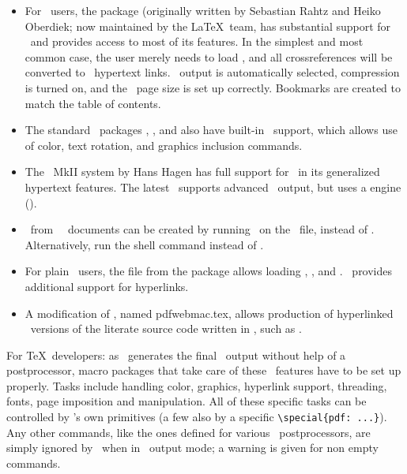 \documentclass{pdftexmanual}
\begin{document}
\begin{itemize}
\item  For \LATEX\ users, the  package (originally
       written by Sebastian Rahtz and Heiko Oberdiek; now maintained by
       the \LaTeX\ team, has substantial support for \PDFTEX\ and
       provides access to most of its features. In the simplest and most
       common case, the user merely needs to load , and
       all cross\hyph references will be converted to \PDF\ hypertext
       links. \PDF\ output is automatically selected, compression is
       turned on, and the \PDF\ page size is set up correctly. Bookmarks
       are created to match the table of contents.

\item  The standard \LATEX\ packages , , and
        also have built-in \PDFTEX\ support, which allows
       use of color, text rotation, and graphics inclusion commands.

\item  The \CONTEXT\ MkII system by Hans Hagen has full support
       for \PDFTEX\ in its generalized hypertext features.
       The latest \CONTEXT\ supports advanced \PDF\ output, but
       uses a engine (\LMTX).

\item  \PDF\ from \GNU\ \TEXINFO\ documents can be created by running
       \PDFTEX\ on the \TEXINFO\ file, instead of \TEX. Alternatively,
       run the shell command  instead of .

\item  For plain \TEX\ users, the  file from the
        package allows loading ,
       , and . \EPLAIN\ provides additional
       support for hyperlinks.

\item  A modification of , named \filename
       {pdfwebmac.tex}, allows production of hyperlinked \PDF\ versions
       of the literate source code written in \WEB, such as \PDFTEX.

\end{itemize}

For \TeX\ developers: as \PDFTEX\ generates the final \PDF\ output
without help of a postprocessor, macro packages that take care of these
\PDF\ features have to be set up properly. Tasks include handling color,
graphics, hyperlink support, threading, fonts, page imposition and
manipulation. All of these \PDF\hyph specific tasks can be controlled by
\PDFTEX's own primitives (a few also by a \PDFTEX\hyph specific
\verb|\special{pdf: ...}|). Any other  commands, like the
ones defined for various \DVI\ postprocessors, are simply ignored by
\PDFTEX\ when in \PDF\ output mode; a warning is given for non\hyph
empty  commands.
\end{document}

